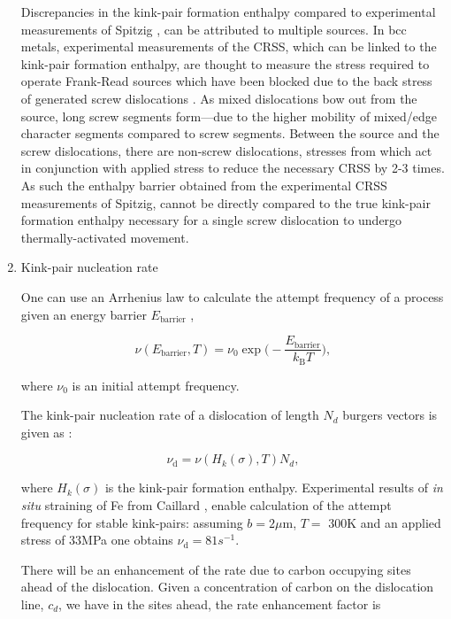 \documentclass[a4paper,12pt,oneside,print,numbered,index,PageStyleIII]{PhDThesisPSnPDF}
\begin{document}
\begin{enumerate}
Discrepancies in the kink-pair formation enthalpy compared to experimental
measurements of Spitzig \cite{Spitzig_1970}, can be attributed to multiple
sources. In bcc metals, experimental measurements of the CRSS, which can be
linked to the kink-pair formation enthalpy, are thought to measure the
stress required to operate Frank-Read sources which have been blocked due to
the back stress of generated screw dislocations \cite{Groger2007}. As mixed
dislocations bow out from the source, long screw segments form---due to the
higher mobility of mixed/edge character segments compared to screw
segments. Between the source and the screw dislocations, there are non-screw
dislocations, stresses from which act in conjunction with applied stress to
reduce the necessary CRSS by 2-3 times. As such the enthalpy barrier
obtained from the experimental CRSS measurements of Spitzig, cannot be
directly compared to the true kink-pair formation enthalpy necessary for a
single screw dislocation to undergo thermally-activated movement.

\item Kink-pair nucleation rate
\label{sec:org850578d}
\label{sec:kink-pair_nucleation_rate}

One can use an Arrhenius law to calculate the attempt frequency of a process given an
energy barrier \(E_{\text{barrier} }\) \cite{Henkelman2000},

\begin{equation} \label{eq:jumprate}
   \nu ( E_{\text{barrier}},T ) = \nu_0 \exp \big( - \frac{ E_{\text{barrier} }}{ k_{\text{B}} T} \big),
\end{equation}

where \(\nu_0\) is an initial attempt frequency.

The kink-pair nucleation rate of a dislocation of length \(N_d\) burgers vectors is
given as \cite{itakura13_effec_hydrog_atoms_screw_disloc}:


\begin{equation} \label{eq:kinkrate}
\nu_{\text{d}} = \nu ( H_k(\sigma),T ) N_d,
\end{equation}

where \(H_k(\sigma)\) is the kink-pair formation
enthalpy. Experimental results of \emph{in situ} straining of Fe from Caillard
\cite{Caillard2010}, enable calculation of the attempt frequency for stable
kink-pairs: assuming \(b = 2\mu\text{m}\), \(T=\) 300K and an applied stress of
33MPa one obtains \(\nu_{\text{d} } = 81s^{-1}\).

There will be an enhancement of the rate due to carbon occupying sites ahead
of the dislocation. Given a concentration of carbon on the dislocation line, \(c_d\), we
have in the sites ahead, the rate enhancement factor is


\end{enumerate}
\end{document}
